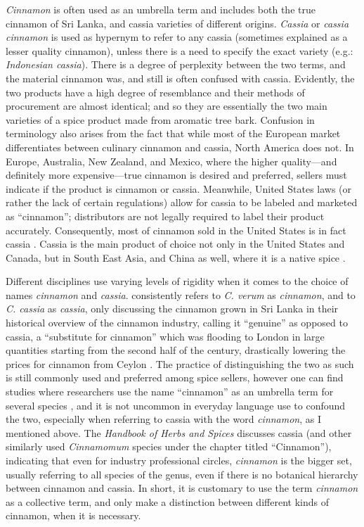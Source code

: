 \textit{Cinnamon} is often used as an umbrella term and includes both the true cinnamon of Sri Lanka, and cassia varieties of different origins. \textit{Cassia} or \textit{cassia cinnamon} is used as hypernym to refer to any cassia (sometimes explained as a lesser quality cinnamon), unless there is a need to specify the exact variety (e.g.: \textit{Indonesian cassia}). There is a degree of perplexity between the two terms, and the material cinnamon was, and still is often confused with cassia. Evidently, the two products have a high degree of resemblance and their methods of procurement are almost identical; and so they are essentially the two main varieties of a spice product made from aromatic tree bark. Confusion in terminology also arises from the fact that while most of the European market differentiates between culinary cinnamon and cassia, North America does not. In Europe, Australia, New Zealand, and Mexico, where the higher quality---and definitely more expensive---true cinnamon is desired and preferred, sellers must indicate if the product is cinnamon or cassia. Meanwhile, United States laws (or rather the lack of certain regulations) allow for cassia to be labeled and marketed as ``cinnamon''; distributors are not legally required to label their product accurately. Consequently, most of cinnamon sold in the United States is in fact cassia \autocite[124]{czarra_spices_2009}. Cassia is the main product of choice not only in the United States and Canada, but in South East Asia, and China as well, where it is a native spice \autocite[104]{van_wyk_culinary_2014}.

Different disciplines use varying levels of rigidity when it comes to the choice of names \textit{cinnamon} and \textit{cassia}. \textcite{wijesekera_chemistry_1978} consistently refers to \textit{C. verum} as \textit{cinnamon}, and to \textit{C. cassia} as \textit{cassia}, only discussing the cinnamon grown in Sri Lanka in their historical overview of the cinnamon industry, calling it ``genuine'' as opposed to cassia, a ``substitute for cinnamon'' which was flooding to London in large quantities starting from the second half of the  century, drastically lowering the prices for cinnamon from Ceylon \autocite{wijesekera_chemistry_1978}. The practice of distinguishing the two as such is still commonly used and preferred among spice sellers, however one can find studies where researchers use the name ``cinnamon'' as an umbrella term for several species \autocite[see][]{rao_cinnamon_2014}, and it is not uncommon in everyday language use to confound the two, especially when referring to cassia with the word \textit{cinnamon}, as I mentioned above. The \textit{Handbook of Herbs and Spices} \autocite{peter_handbook_2012} discusses cassia (and other similarly used \textit{Cinnamomum} species under the chapter titled ``Cinnamon''), indicating that even for industry professional circles, \textit{cinnamon} is the bigger set, usually referring to all species of the genus, even if there is no botanical hierarchy between cinnamon and cassia. In short, it is customary to use the term \textit{cinnamon} as a collective term, and only make a distinction between different kinds of cinnamon, when it is necessary. 

